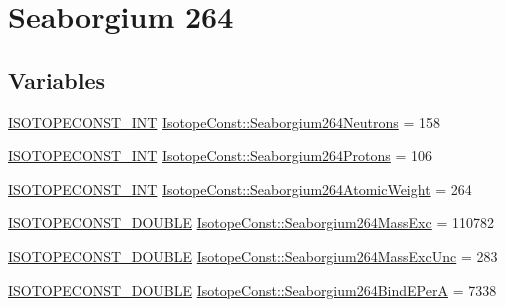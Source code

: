 \hypertarget{group___isotope_const-_seaborgium-_sg264}{}\section{Seaborgium 264}
\label{group___isotope_const-_seaborgium-_sg264}
\subsection*{Variables}
\begin{DoxyCompactItemize}
\item 
\mbox{\hyperlink{group___isotope_const-_macros_ga5f18360b3e99483a35c32d789e62621c}{I\+S\+O\+T\+O\+P\+E\+C\+O\+N\+S\+T\+\_\+\+I\+NT}} \mbox{\hyperlink{group___isotope_const-_seaborgium-_sg264_gaa0f4b0fafad886f5d8efb8b7280f0dda}{Isotope\+Const\+::\+Seaborgium264\+Neutrons}} = 158
\item 
\mbox{\hyperlink{group___isotope_const-_macros_ga5f18360b3e99483a35c32d789e62621c}{I\+S\+O\+T\+O\+P\+E\+C\+O\+N\+S\+T\+\_\+\+I\+NT}} \mbox{\hyperlink{group___isotope_const-_seaborgium-_sg264_ga6076471b43c794211cb8dd2fe3438d1d}{Isotope\+Const\+::\+Seaborgium264\+Protons}} = 106
\item 
\mbox{\hyperlink{group___isotope_const-_macros_ga5f18360b3e99483a35c32d789e62621c}{I\+S\+O\+T\+O\+P\+E\+C\+O\+N\+S\+T\+\_\+\+I\+NT}} \mbox{\hyperlink{group___isotope_const-_seaborgium-_sg264_ga125ecd1d011ca85443012e92904d4a0f}{Isotope\+Const\+::\+Seaborgium264\+Atomic\+Weight}} = 264
\item 
\mbox{\hyperlink{group___isotope_const-_macros_ga8f45a7272ce02c0b4c65c44636ed719a}{I\+S\+O\+T\+O\+P\+E\+C\+O\+N\+S\+T\+\_\+\+D\+O\+U\+B\+LE}} \mbox{\hyperlink{group___isotope_const-_seaborgium-_sg264_ga6d27b4d1f8e35dda1bb089cdeadf5423}{Isotope\+Const\+::\+Seaborgium264\+Mass\+Exc}} = 110782
\item 
\mbox{\hyperlink{group___isotope_const-_macros_ga8f45a7272ce02c0b4c65c44636ed719a}{I\+S\+O\+T\+O\+P\+E\+C\+O\+N\+S\+T\+\_\+\+D\+O\+U\+B\+LE}} \mbox{\hyperlink{group___isotope_const-_seaborgium-_sg264_ga48c6036534b11fd4f521de1ad143c38a}{Isotope\+Const\+::\+Seaborgium264\+Mass\+Exc\+Unc}} = 283
\item 
\mbox{\hyperlink{group___isotope_const-_macros_ga8f45a7272ce02c0b4c65c44636ed719a}{I\+S\+O\+T\+O\+P\+E\+C\+O\+N\+S\+T\+\_\+\+D\+O\+U\+B\+LE}} \mbox{\hyperlink{group___isotope_const-_seaborgium-_sg264_gad968051bb69fe17c6aa990463b2af106}{Isotope\+Const\+::\+Seaborgium264\+Bind\+E\+PerA}} = 7338
\item 

\end{DoxyCompactItemize}
